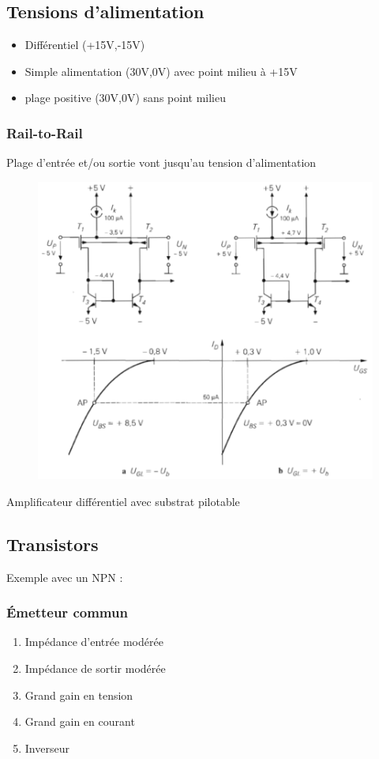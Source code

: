 \documentclass[resume]{subfiles}
\begin{document}
\begin{multicols}{3}
\subsection{Tensions d'alimentation}
\begin{itemize}
\item Différentiel (+15V,-15V)
\item Simple alimentation (30V,0V) avec point milieu à +15V
\item plage positive (30V,0V) sans point milieu
\end{itemize}

\subsubsection{Rail-to-Rail}
Plage d'entrée et/ou sortie vont jusqu'au tension d'alimentation
\begin{figure}[H]
    \centering
    \includegraphics[width=0.8\columnwidth]{../images/OpAmp1/railTorail.png}
\end{figure}
Amplificateur différentiel avec substrat pilotable

\subsection{Transistors}
Exemple avec un NPN :
\subsubsection{Émetteur commun}
\begin{enumerate}
\item Impédance d'entrée modérée
\item Impédance de sortir modérée
\item Grand gain en tension
\item Grand gain en courant
\item Inverseur
\end{enumerate}

\end{multicols}
\end{document}
